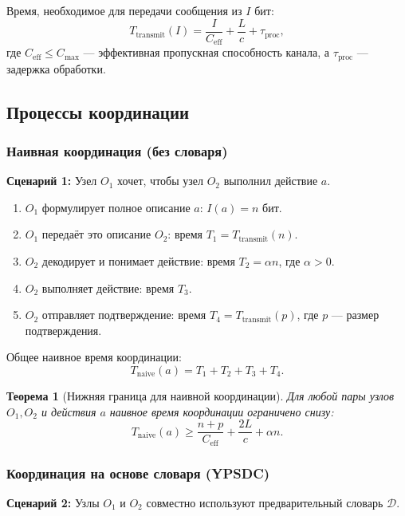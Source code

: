 \documentclass[12pt]{article}
\newtheorem{theorem}{Теорема}
\begin{document}
	Время, необходимое для передачи сообщения из $I$ бит:
	\[
	T_{\text{transmit}}(I) = \frac{I}{C_{\text{eff}}} + \frac{L}{c} + \tau_{\text{proc}},
	\]
	где $C_{\text{eff}} \leq C_{\text{max}}$ — эффективная пропускная способность канала, а $\tau_{\text{proc}}$ — задержка обработки.
	
	\subsection{Процессы координации}
	\label{app:coordination-processes}
	
	\subsubsection{Наивная координация (без словаря)}
	
	\textbf{Сценарий 1:} Узел $O_1$ хочет, чтобы узел $O_2$ выполнил действие $a$.
	
	\begin{enumerate}
		\item $O_1$ формулирует полное описание $a$: $I(a) = n$ бит.
		\item $O_1$ передаёт это описание $O_2$: время $T_1 = T_{\text{transmit}}(n)$.
		\item $O_2$ декодирует и понимает действие: время $T_2 = \alpha n$, где $\alpha > 0$.
		\item $O_2$ выполняет действие: время $T_3$.
		\item $O_2$ отправляет подтверждение: время $T_4 = T_{\text{transmit}}(p)$, где $p$ — размер подтверждения.
	\end{enumerate}
	
	Общее наивное время координации:
	\[
	T_{\text{naive}}(a) = T_1 + T_2 + T_3 + T_4.
	\]
	
	\begin{theorem}[Нижняя граница для наивной координации]
		\label{thm:naive-lower-bound}
		Для любой пары узлов $O_1, O_2$ и действия $a$ наивное время координации ограничено снизу:
		\[
		T_{\text{naive}}(a) \geq \frac{n + p}{C_{\text{eff}}} + \frac{2L}{c} + \alpha n.
		\]
	\end{theorem}
	
	\subsubsection{Координация на основе словаря (YPSDC)}
	
	\textbf{Сценарий 2:} Узлы $O_1$ и $O_2$ совместно используют предварительный словарь $\mathcal{D}$.
	
\end{document}
